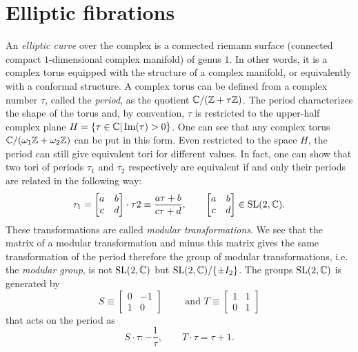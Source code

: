 \section{Elliptic fibrations}

    An \emph{elliptic curve} over the complex is a connected riemann surface (connected compact $1$-dimensional complex manifold) of genus $1$. In other words, it is a complex torus equipped with the structure of a complex manifold, or equivalently with a conformal structure. A complex torus can be defined from a complex number $\tau$, called the \emph{period}, as the quotient $\mathbb{C}/(\mathbb{Z}+\tau\mathbb{Z})$. The period characterizes the shape of the torus and, by convention, $\tau$ is restricted to the upper-half complex plane $H=\{\tau\in\mathbb{C}|\Im(\tau)>0\}$. One can see that any complex torus $\mathbb{C}/(\omega_1\mathbb{Z}+\omega_2\mathbb{Z})$ can be put in this form. Even restricted to the space $H$, the period can still give equivalent tori for different values. In fact, one can show that two tori of periods $\tau_1$ and $\tau_2$ respectively are equivalent if and only their periods are related in the following way:
    \begin{equation}
        \tau_1=
        \begin{bmatrix}
            a & b \\
            c & d
        \end{bmatrix}\cdot\tau2\equiv \frac{a\tau+b}{c\tau+d},\qquad \begin{bmatrix}
            a & b \\
            c & d
        \end{bmatrix}\in\text{SL}(2,\mathbb{C}).
    \end{equation}
    These transformations are called \emph{modular transformations}. We see that the matrix of a modular transformation and minus this matrix gives the same transformation of the period therefore the group of modular transformations, i.e. the \emph{modular group}, is not $\text{SL}(2,\mathbb{C})$ but $\text{SL}(2,\mathbb{C})/\{\pm I_{2}\}$. The groups $\text{SL}(2,\mathbb{C})$ is generated by
    \begin{equation}
        S\equiv
            \begin{bmatrix}
                0 & -1 \\
                1 & 0
            \end{bmatrix}\qquad\text{ and }
        T\equiv
            \begin{bmatrix}
                1 & 1 \\
                0 & 1
            \end{bmatrix}
    \end{equation}
    that acts on the period as
    \begin{equation}
        S\cdot\tau:-\frac{1}{\tau},\qquad T\cdot\tau=\tau+1.
    \end{equation}

